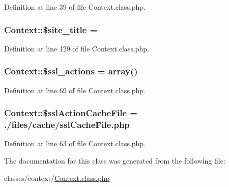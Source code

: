 Definition at line 39 of file Context.\+class.\+php.

\subsubsection[{\texorpdfstring{\$site\+\_\+title}{$site_title}}]{\setlength{\rightskip}{0pt plus 5cm}Context\+::\$site\+\_\+title = \textquotesingle{}\textquotesingle{}}\hypertarget{classContext_a3663ad0bbcb194dbb5766db96c9ecefb}{}\label{classContext_a3663ad0bbcb194dbb5766db96c9ecefb}


Definition at line 129 of file Context.\+class.\+php.

\subsubsection[{\texorpdfstring{\$ssl\+\_\+actions}{$ssl_actions}}]{\setlength{\rightskip}{0pt plus 5cm}Context\+::\$ssl\+\_\+actions = array()}\hypertarget{classContext_a9f8d33aa42d3851da1134d3ba2fbf009}{}\label{classContext_a9f8d33aa42d3851da1134d3ba2fbf009}


Definition at line 69 of file Context.\+class.\+php.

\subsubsection[{\texorpdfstring{\$ssl\+Action\+Cache\+File}{$sslActionCacheFile}}]{\setlength{\rightskip}{0pt plus 5cm}Context\+::\$ssl\+Action\+Cache\+File = \textquotesingle{}./{\bf files}/cache/ssl\+Cache\+File.\+php\textquotesingle{}}\hypertarget{classContext_a5554b6376a0703ebfbdf2bf79800bfee}{}\label{classContext_a5554b6376a0703ebfbdf2bf79800bfee}


Definition at line 63 of file Context.\+class.\+php.



The documentation for this class was generated from the following file\+:\begin{DoxyCompactItemize}
\item 
classes/context/\hyperlink{Context_8class_8php}{Context.\+class.\+php}\end{DoxyCompactItemize}
